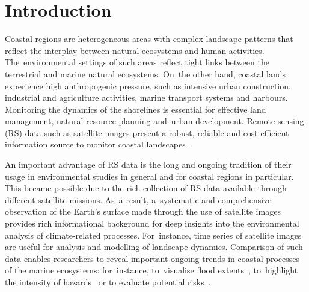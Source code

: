 \documentclass[jmse,article,accept,pdftex,oneauthor]{Definitions/mdpi}
\begin{document}
\section{Introduction}

Coastal regions are heterogeneous areas with complex landscape patterns that reflect the interplay between natural ecosystems and human activities. The~environmental settings of such areas reflect tight links between the terrestrial and marine natural ecosystems. On~the other hand, coastal lands experience high anthropogenic pressure, such as intensive urban construction, industrial and agriculture activities, marine transport systems and harbours. Monitoring the dynamics of the shorelines is essential for effective land management, natural resource planning and~urban development. Remote sensing (RS) data such as satellite images present a robust, reliable and cost-efficient information source to monitor coastal landscapes~\cite{AGATE2024108639,Lemenkova202405,LIU2024120096}. 

An important advantage of RS data is the long and ongoing tradition of their usage in environmental studies in general and for coastal regions in particular. This became possible due to the rich collection of RS data available through different satellite missions. As~a result, a~systematic and comprehensive observation of the Earth's surface made through the use of satellite images provides rich informational background for deep insights into the environmental analysis of climate-related processes. For~instance, time series of satellite images are useful for analysis and modelling of landscape dynamics. Comparison of such data enables researchers %
to reveal important ongoing trends in coastal processes of the marine ecosystems: for~instance, to~visualise flood extents~\cite{10282975}, to~highlight the intensity of hazards~\cite{8517662} or to evaluate potential risks~\cite{8900280}. 
\end{document}
